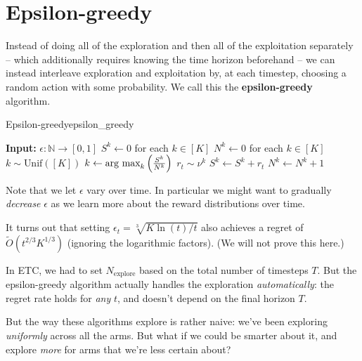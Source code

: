 \documentclass[\main/main]{subfiles}
\newcommand{\Nex}{N_{\text{explore}}}
\begin{document}
\section{Epsilon-greedy}

Instead of doing all of the exploration and then all of the exploitation separately -- which additionally requires knowing the time horizon beforehand -- we can instead interleave exploration and exploitation by, at each timestep, choosing a random action with some probability. We call this the \textbf{epsilon-greedy} algorithm.

\begin{definition}{Epsilon-greedy}{epsilon_greedy}
    \begin{algorithmic}
        \State \textbf{Input:} $\epsilon : \mathbb{N} \to [0, 1]$
        \State $S^k \gets 0$ for each $k \in [K]$ 
        \State $N^k \gets 0$ for each $k \in [K]$ 
        \State $k \sim \text{Unif}([K])$
        \Else
        \State $k \gets \operatorname*{\textrm{arg\ max}}_k \left(\frac{S^k}{N^k}\right)$
        \EndIf
        \State $r_t \sim \nu^k$
        \State $S^k \gets S^k + r_t$
        \State $N^k \gets N^k + 1$
        \EndFor
    \end{algorithmic}
\end{definition}

Note that we let $\epsilon$ vary over time. In particular we might want to gradually \emph{decrease} $\epsilon$ as we learn more about the reward distributions over time.

It turns out that setting $\epsilon_t = \sqrt[3]{K \ln(t)/t}$ also achieves a regret of $\tilde O(t^{2/3} K^{1/3})$ (ignoring the logarithmic factors). (We will not prove this here.)


In ETC, we had to set $\Nex$ based on the total number of timesteps $T$. But the epsilon-greedy algorithm actually handles the exploration \emph{automatically}: the regret rate holds for \emph{any} $t$, and doesn't depend on the final horizon $T$.

But the way these algorithms explore is rather naive: we've been exploring \emph{uniformly} across all the arms. But what if we could be smarter about it, and explore \emph{more} for arms that we're less certain about?
\end{document}
